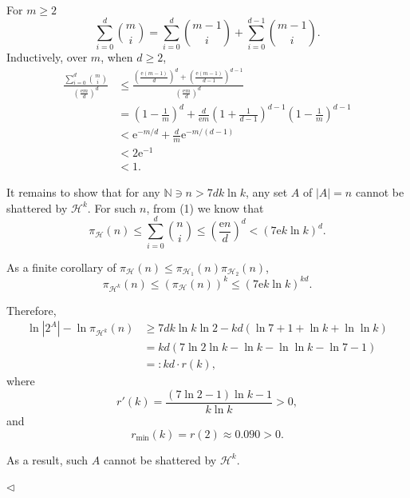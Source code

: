 ﻿\documentclass[11pt]{article}
\newenvironment{answer}[1][Answer]{\begin{trivlist}
\item[\hskip \labelsep {\bfseries #1.}\hskip \labelsep]}{\hfill$\lhd$\end{trivlist}}
\begin{document}
\begin{answer} ~
\begin{item}
    \item[(1)] For $m\ge 2$
    $$
        \sum_{i=0}^d\binom{m}{i}=\sum_{i=0}^{d}\binom{m-1}{i}+\sum_{i=0}^{d-1}\binom{m-1}{i}.
    $$
    Inductively, over $m$, when $d\ge 2$,
    $$
        \begin{aligned}
            \frac{\sum_{i=0}^d\binom{m}{i}}{\left(\frac{\mathrm{e}m}{d}\right)^d}
            &\le \frac{\left(\frac{\mathrm{e}(m-1)}{d}\right)^d+\left(\frac{\mathrm{e}(m-1)}{d-1}\right)^{d-1}}{\left(\frac{\mathrm{e}m}{d}\right)^d}\\
            &= \left(1-\frac{1}{m}\right)^d+\frac{d}{\mathrm{e}m}\left(1+\frac{1}{d-1}\right)^{d-1}\left(1-\frac{1}{m}\right)^{d-1}\\
            &< \mathrm{e}^{-m/d}+\frac{d}{m}\mathrm{e}^{-m/(d-1)}\\
            &< 2\mathrm{e}^{-1}\\
            &< 1.
        \end{aligned}
    $$

    \item[(2)] It remains to show that for any $\mathbb{N}\ni n>7dk\ln k$, any set $A$ of $|A|=n$ cannot be shattered by $\mathcal H^k$. For such $n$, from (1) we know that
    $$
        \pi_{\mathcal H}(n)\le\sum_{i=0}^d\binom{n}{i}\le\left(\frac{\mathrm{e}n}{d}\right)^d<(7\mathrm{e}k\ln k)^d.
    $$

    As a finite corollary of $\pi_{\mathcal H}(n)\le\pi_{\mathcal H_1}(n)\pi_{\mathcal H_2}(n)$,
    $$
        \pi_{\mathcal H^k}(n)\le (\pi_{\mathcal H}(n))^k\le (7\mathrm{e}k\ln k)^{kd}.
    $$

    Therefore,
    $$
        \begin{aligned}
            \ln|2^A|-\ln\pi_{\mathcal H^k}(n) &\ge 7dk\ln k\ln 2-kd(\ln 7+1+\ln k+\ln\ln k)\\
            &= kd(7\ln 2\ln k-\ln k-\ln\ln k-\ln 7-1)\\
            &=: kd\cdot r(k),
        \end{aligned}
    $$
    where
    $$
        r'(k)=\frac{(7\ln 2-1)\ln k-1}{k\ln k}>0,
    $$
    and
    $$
        r_{\min}(k)=r(2)\approx 0.090>0.
    $$

    As a result, such $A$ cannot be shattered by $\mathcal H^k$.
\end{item}
\end{answer}
\end{document}
